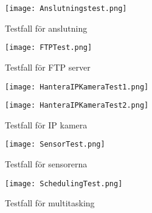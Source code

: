 \begin{figure}[h]
  \texttt{[image: Anslutningstest.png]}
  \caption{Testfall för anslutning}
  \label{fig:Anslutningstest}
\end{figure}

\begin{figure}[h]
  \texttt{[image: FTPTest.png]}
  \caption{Testfall för FTP server}
  \label{fig:FTPTest}
\end{figure}

\begin{figure}[h]
  \texttt{[image: HanteraIPKameraTest1.png]}
  \label{fig:HanteraIPKameraTest1}
\end{figure}

\newpage

\begin{figure}[h]
  \texttt{[image: HanteraIPKameraTest2.png]}
  \caption{Testfall för IP kamera}
  \label{fig:HanteraIPKameraTest2}
\end{figure}


\begin{figure}[h]
  \texttt{[image: SensorTest.png]}
  \caption{Testfall för sensorerna}
  \label{fig:SensorTest}
\end{figure}

\begin{figure}[h]
  \texttt{[image: SchedulingTest.png]}
  \caption{Testfall för multitasking}
  \label{fig:SchedulingTest}
\end{figure}




